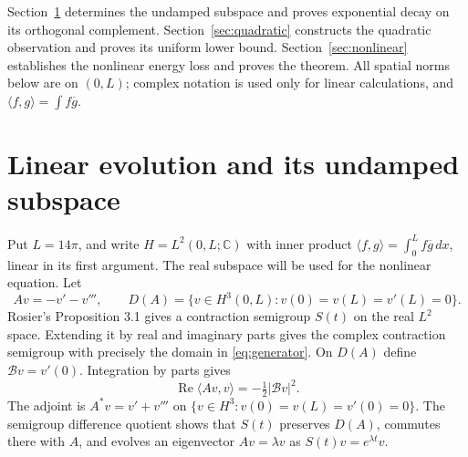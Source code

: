 \documentclass[11pt]{article}
\theoremstyle{remark}\newtheorem{remark}[theorem]{Remark}
\numberwithin{equation}{section}
\begin{document}
Section~\ref{sec:linear} determines the undamped subspace and proves
exponential decay on its orthogonal complement. Section~\ref{sec:quadratic}
constructs the quadratic observation and proves its uniform lower bound.
Section~\ref{sec:nonlinear} establishes the nonlinear energy loss and proves
the theorem. All spatial norms below are on $(0,L)$; complex notation is used
only for linear calculations, and $\langle f,g\rangle=\int f\overline g$.
\section{Linear evolution and its undamped subspace}\label{sec:linear}
Put $L=14\pi$, and write $H=L^2(0,L;\mathbb C)$ with inner product
$\langle f,g\rangle=\int_0^L f\overline g\,dx$, linear in its first argument.
The real subspace will be used for the nonlinear equation. Let
\begin{equation}\label{eq:generator}
 Av=-v'-v''',\qquad D(A)=\{v\in H^3(0,L):v(0)=v(L)=v'(L)=0\}.
\end{equation}
Rosier's Proposition 3.1 \cite{Rosier} gives a contraction semigroup $S(t)$
on the real $L^2$ space. Extending it by real and imaginary parts gives the
complex contraction semigroup with precisely the domain in \eqref{eq:generator}.
On $D(A)$ define $\mathcal Bv=v'(0)$. Integration by parts gives
\begin{equation}\label{eq:dissipative}
 \operatorname{Re}\langle Av,v\rangle=-\tfrac12|\mathcal Bv|^2.
\end{equation}
The adjoint is $A^*v=v'+v'''$ on $\{v\in H^3:v(0)=v(L)=v'(0)=0\}$.
The semigroup difference quotient shows that $S(t)$ preserves $D(A)$,
commutes there with $A$, and evolves an eigenvector $Av=\lambda v$ as
$S(t)v=e^{\lambda t}v$.
\end{document}

